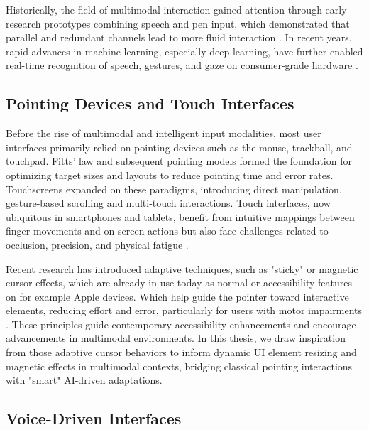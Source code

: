 \documentclass[openany]{book}
\begin{document}

Historically, the field of multimodal interaction gained attention through early research prototypes combining speech and pen input, which demonstrated that parallel and redundant channels lead to more fluid interaction \cite{10.1145/319382.319398, Oviatt2004}. In recent years, rapid advances in machine learning, especially deep learning, have further enabled real-time recognition of speech, gestures, and gaze on consumer-grade hardware \cite{lugaresi2019mediapipeframeworkbuildingperception, Choudhury2015}.

\subsection{Pointing Devices and Touch Interfaces}
Before the rise of multimodal and intelligent input modalities, most user interfaces primarily relied on pointing devices such as the mouse, trackball, and touchpad. Fitts' law \cite{Fitts1954} and subsequent pointing models formed the foundation for optimizing target sizes and layouts to reduce pointing time and error rates.  
Touchscreens expanded on these paradigms, introducing direct manipulation, gesture-based scrolling and multi-touch interactions. Touch interfaces, now ubiquitous in smartphones and tablets, benefit from intuitive mappings between finger movements and on-screen actions but also face challenges related to occlusion, precision, and physical fatigue \cite{Wigdor2011BraveNUI}.

Recent research has introduced adaptive techniques, such as "sticky" or magnetic cursor effects, which are already in use today as normal or accessibility features on for example Apple devices. Which help guide the pointer toward interactive elements, reducing effort and error, particularly for users with motor impairments \cite{Cockburn2008Sticky}. These principles guide contemporary accessibility enhancements and encourage advancements in multimodal environments.
In this thesis, we draw inspiration from those adaptive cursor behaviors to inform dynamic UI element resizing and magnetic effects in multimodal contexts, bridging classical pointing interactions with "smart" AI-driven adaptations.

\subsection{Voice-Driven Interfaces}
\end{document}
